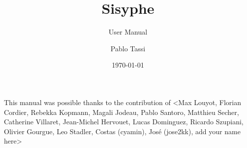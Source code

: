 \documentclass[Sisyphe]{../../data/TelemacDoc} %
\begin{document}
\let\cleardoublepage\clearpage

\setlength\parindent{0pt}

\title{Sisyphe}
\subtitle{User Manual}
\version{\telmaversion}
\author{Pablo Tassi}
\date{\today}
\maketitle
\clearpage



\newpage

\thispagestyle{empty}

\TelemacCopyright{}




\pagestyle{empty} %

\tableofcontents%


\pagestyle{fancy} %

\pagebreak
This manual was possible thanks to the contribution of <Max Louyot, Florian Cordier, Rebekka Kopmann, Magali Jodeau, Pablo Santoro, Matthieu Secher, Catherine Villaret, Jean-Michel Hervouet, Lucas Dominguez, Ricardo Szupiani, Olivier Gourgue, Leo Stadler, Costas (cyamin), Jos\'e (jose2kk), add your name here>
\pagebreak



\end{document}
